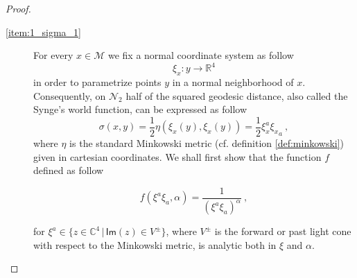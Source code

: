 \documentclass[11pt]{book}
\renewcommand{\Im}{\mathsf{Im}}
\newcommand{\Mcal}{\mathcal{M}}
\newcommand{\Ncal}{\mathcal{N}}
\newcommand{\Rbb}{\mathbb{R}}
\theoremstyle{break}
\begin{document}
\begin{proof}
\begin{description}
\item[\ref{item:1_sigma_1}] For every $x \in \Mcal$ we fix a normal coordinate system as follow
%
\begin{equation}
\xi_x : y \to \Rbb^4 
\label{eq:normal_coord}
\end{equation}
%
in order to parametrize points $y$ in a normal neighborhood of $x$. Consequently, on $\Ncal_2$ half of the squared geodesic distance, also called the Synge's world function, can be expressed as follow
%
\begin{equation}
\sigma(x,y)= \frac{1}{2}\eta(\xi_x(y),\xi_x(y)) = \frac{1}{2}\xi_x^{a}{\xi_x}_{a} \ , 
\label{eq:sigma_normal_coord}
\end{equation}
%
where $\eta$ is the standard Minkowski metric (cf. definition \ref{def:minkowski}) given in cartesian coordinates. We shall first show that the function $f$ defined as follow

\begin{equation}
f(\xi^a\xi_{a},\alpha) = \frac{1}{(\xi^{a}\xi_{a})^\alpha} \ , 
\label{sigma_reg_normal_coord}
\end{equation}

for $\xi^{a} \in \{z\in \mathbb{C}^4 \,|\,\Im(z) \in V^\pm \}$, where $V^\pm$ is the forward or past light cone with respect to the Minkowski metric, is  analytic both in $\xi$ and $\alpha$.



\end{description}
\end{proof}
\end{document}
